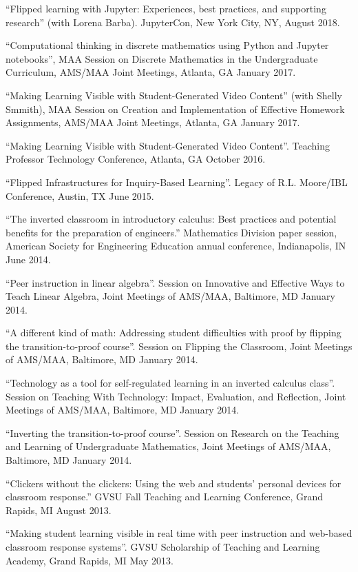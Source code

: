 \documentclass[letterpaper]{article}
\renewenvironment{itemize}{
  \begin{list}{}{
    \setlength{\leftmargin}{1.5em}
	\setlength{\itemsep}{0in}
  }
}{
  \end{list}
}
\begin{document}
\begin{itemize}
	\item ``Flipped learning with Jupyter: Experiences, best practices, and supporting research'' (with Lorena Barba). JupyterCon, New York City, NY, August 2018.
	\item ``Computational thinking in discrete mathematics using Python and Jupyter notebooks'', MAA Session on Discrete Mathematics in the Undergraduate Curriculum, AMS/MAA Joint Meetings, Atlanta, GA January 2017.
  \item ``Making Learning Visible with Student-Generated Video Content'' (with Shelly Smmith), MAA Session on Creation and Implementation of Effective Homework Assignments, AMS/MAA Joint Meetings, Atlanta, GA January 2017.
	\item ``Making Learning Visible with Student-Generated Video Content''. Teaching Professor Technology Conference, Atlanta, GA October 2016.
	\item ``Flipped Infrastructures for Inquiry-Based Learning''. Legacy of R.L. Moore/IBL Conference, Austin, TX June 2015.
	\item ``The inverted classroom in introductory calculus: Best practices and potential benefits for the preparation of engineers.'' Mathematics Division paper session, American Society for Engineering Education annual conference, Indianapolis, IN June 2014.
	\item ``Peer instruction in linear algebra''. Session on Innovative and Effective Ways to Teach Linear Algebra, Joint Meetings of AMS/MAA, Baltimore, MD January 2014.
	\item ``A different kind of math: Addressing student difficulties with proof by flipping the transition-to-proof course''. Session on Flipping the Classroom, Joint Meetings of AMS/MAA, Baltimore, MD January 2014.
	\item ``Technology as a tool for self-regulated learning in an inverted calculus class''. Session on Teaching With Technology: Impact, Evaluation, and Reflection, Joint Meetings of AMS/MAA, Baltimore, MD January 2014.
	\item ``Inverting the transition-to-proof course''. Session on Research on the Teaching and Learning of Undergraduate Mathematics, Joint Meetings of AMS/MAA, Baltimore, MD January 2014.
	\item ``Clickers without the clickers: Using the web and students' personal devices for classroom response.'' GVSU Fall Teaching and Learning Conference, Grand Rapids, MI August 2013.
	\item ``Making student learning visible in real time with peer instruction and web-based classroom response systems''. GVSU Scholarship of Teaching and Learning Academy, Grand Rapids, MI May 2013.

\end{itemize}
\end{document}
